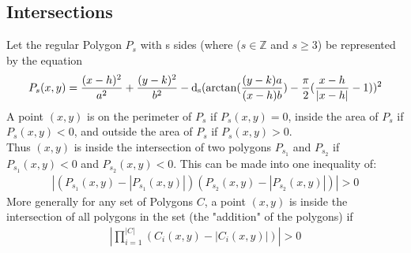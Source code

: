 \documentclass[11pt]{article}
\DeclareMathOperator{\custdsq}{\mathrm{d}_s}
\DeclarePairedDelimiter\abs{\lvert}{\rvert}%
\begin{document}
\subsection{Intersections}
Let the regular Polygon \(P_s\) with s sides (where (\(s\in\mathbb{Z}\) and \(s\geq3\)) be represented by the equation
\begin{gather*}
P_s(x,y)=\frac{(x-h)^2}{a^2}+\frac{(y-k)^2}{b^2}-\custdsq(\arctan(\frac{(y-k)a}{(x-h)b})-\frac{\pi}{2}(\frac{x-h}{\abs{x-h}}-1))^2
\end{gather*}
A point \((x,y)\) is on the perimeter of \(P_s\) if \(P_s(x,y)=0\), inside the area of \(P_s\) if \(P_s(x,y)<0\), and outside the area of \(P_s\) if \(P_s(x,y)>0\).\\
Thus \((x,y)\) is inside the intersection of two polygons \(P_{s_1}\) and \(P_{s_2}\) if \(P_{s_1}(x,y)<0\) and \(P_{s_2}(x,y)<0\). This can be made into one inequality of:
\begin{gather*}
\left|(P_{s_1}(x,y)-|P_{s_1}(x,y)|)(P_{s_2}(x,y)-|P_{s_2}(x,y)|)\right|>0
\end{gather*}
More generally for any set of Polygons \(C\), a point \((x,y)\) is inside the intersection of all polygons in the set (the "addition" of the polygons) if
\begin{gather*}
\left|\prod_{i=1}^{|C|}(C_i(x,y)-|C_i(x,y)|)\right|>0
\end{gather*}
\end{document}
